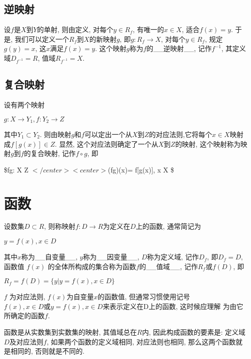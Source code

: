 \documentclass[11pt]{article}
\begin{document}
\subsection{逆映射}\label{ux9006ux6620ux5c04}

设\(f\)是\(X\)到\(Y\)的单射, 则由定义, 对每个\(y \in R_{f}\),
有唯一的\(x \in X\), 适合\(f(x) = y\). 于是,
我们可以定义一个\(R_{f}\)到\(X\)的新映射\(g\),
即\(g: R_{f} \rightarrow X\), 对每个\(y \in R_{f}\), 规定\(g(y) = x\),
这\(x\)满足\(f(x) = y\). 这个映射\(g\)称为\(f\)的\_\_逆映射\_\_,
记作\(f^{-1}\), 其定义域\(D_{f^{-1}}=R\), 值域\(R_{f^{-1}} = X\).

\subsection{复合映射}\label{ux590dux5408ux6620ux5c04}

设有两个映射

\(g: X \rightarrow Y_{1}, f: Y_{2} \rightarrow Z\)

其中\(Y_{1} \subset Y_{2}\).
则由映射\(g\)和\(f\)可以定出一个从\(X\)到\(Z\)的对应法则,它将每个\(x \in X\)映射成\(f[g(x)] \in Z\).
显然, 这个对应法则确定了一个从\(X\)到\(Z\)的映射,
这个映射称为映射\(g\)到\(f\)的复合映射, 记作\(f\circ g\), 即

\$f\circ g: X \rightarrow Z \(</center> <center>\)(f\circ g)(x)=
f{[}g(x){]}, x \in X \$

\section{函数}\label{ux51fdux6570}

设数集\(D \subset R\),
则称映射\(f: D \rightarrow R\)为定义在\(D\)上的函数, 通常简记为

\(y=f(x), x \in D\)

其中\(x\)称为\_\_自变量\_\_, \(y\)称为\_\_因变量\_\_, \(D\)称为定义域,
记作\(D_{f}\), 即\(D_{f} = D\), 函数值 \(f(x)\)
的全体所构成的集合称为函数\(f\)的\_\_值域\_\_, 记作\(R_{f} 或 f(D)\), 即

\(R_{f} = f(D) = \{y|y=f(x), x \in D\}\)

\(f\) 为对应法则, \(f(x)\)为自变量\(x\)的函数值,
但通常习惯使用记号\(f(x), x \in D 或 y=f(x), x \in D\)来表示定义在D上的函数,
这时候应理解 为由它所确定的函数\(f\).

函数是从实数集到实数集的映射, 其值域总在\(R\)内, 因此构成函数的要素是:
定义域\(D\)及对应法则\(f\), 如果两个函数的定义域相同, 对应法则也相同,
那么这两个函数就是相同的, 否则就是不同的.
\end{document}
